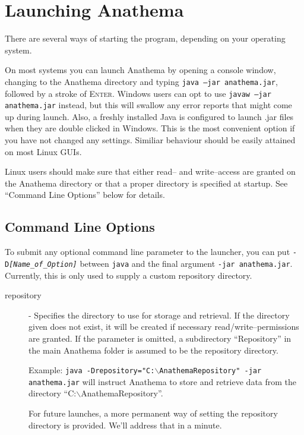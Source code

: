 \section{Launching Anathema }
There are several ways of starting the program, depending on your operating system.

On most systems you can launch Anathema by opening a console window, changing to the Anathema directory and typing \texttt{java --jar anathema.jar}, followed by a stroke of \textsc{Enter}. Windows users can opt to use \linebreak
\texttt{javaw --jar anathema.jar} instead, but this will swallow any error reports that might come up during launch.
Also, a freshly installed Java is configured to launch .jar files when they are double clicked in Windows. This is the most convenient option if you have not changed any settings. Similiar behaviour should be easily attained on most Linux GUIs.

Linux users should make sure that either read-- and write--access are granted on the Anathema directory or
that a proper directory is specified at startup. See ``Command Line Options'' below for details.
  
\subsection{Command Line Options}
To submit any optional command line parameter to the launcher, you can put \linebreak
\texttt{-D\emph{[Name\_of\_Option]}} between \texttt{java} and the final argument \texttt{-jar anathema.jar}. Currently, this is only used to supply a custom repository directory.

\begin{description}
\item[repository] - Specifies the directory to use for storage and retrieval. If the directory given does not exist, it will be created if necessary read/write--permissions are granted. If the parameter is omitted, a subdirectory ``Repository'' in the main Anathema folder is assumed to be the repository directory.

	Example:\newline
	\texttt{java -Drepository="C:$\backslash$AnathemaRepository" -jar anathema.jar} will instruct Anathema to store and retrieve data from the directory 
	\linebreak``C:$\backslash$AnathemaRepository''.
	
For future launches, a more permanent way of setting the repository directory is provided. We'll address that in a minute.
\end{description}

